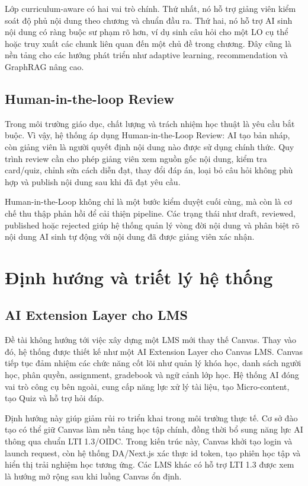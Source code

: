Lớp curriculum-aware có hai vai trò chính. Thứ nhất, nó hỗ trợ giảng viên kiểm
soát độ phủ nội dung theo chương và chuẩn đầu ra. Thứ hai, nó hỗ trợ AI sinh
nội dung có ràng buộc sư phạm rõ hơn, ví dụ sinh câu hỏi cho một LO cụ thể
hoặc truy xuất các chunk liên quan đến một chủ đề trong chương. Đây cũng là
nền tảng cho các hướng phát triển như adaptive learning, recommendation và
GraphRAG nâng cao.

\subsection{Human-in-the-loop Review}

Trong môi trường giáo dục, chất lượng và trách nhiệm học thuật là yêu cầu bắt
buộc. Vì vậy, hệ thống áp dụng Human-in-the-Loop Review: AI tạo bản nháp, còn
giảng viên là người quyết định nội dung nào được sử dụng chính thức. Quy trình
review cần cho phép giảng viên xem nguồn gốc nội dung, kiểm tra card/quiz,
chỉnh sửa cách diễn đạt, thay đổi đáp án, loại bỏ câu hỏi không phù hợp và
publish nội dung sau khi đã đạt yêu cầu.

Human-in-the-Loop không chỉ là một bước kiểm duyệt cuối cùng, mà còn là cơ chế
thu thập phản hồi để cải thiện pipeline. Các trạng thái như draft, reviewed,
published hoặc rejected giúp hệ thống quản lý vòng đời nội dung và phân biệt
rõ nội dung AI sinh tự động với nội dung đã được giảng viên xác nhận.

\section{Định hướng và triết lý hệ thống}

\subsection{AI Extension Layer cho LMS}

Đề tài không hướng tới việc xây dựng một LMS mới thay thế Canvas. Thay vào đó,
hệ thống được thiết kế như một AI Extension Layer cho Canvas LMS. Canvas tiếp
tục đảm nhiệm các chức năng cốt lõi như quản lý khóa học, danh sách người học,
phân quyền, assignment, gradebook và ngữ cảnh lớp học. Hệ thống AI đóng vai
trò công cụ bên ngoài, cung cấp năng lực xử lý tài liệu, tạo Micro-content, tạo
Quiz và hỗ trợ hỏi đáp.

Định hướng này giúp giảm rủi ro triển khai trong môi trường thực tế. Cơ sở đào
tạo có thể giữ Canvas làm nền tảng học tập chính, đồng thời bổ sung năng lực
AI thông qua chuẩn LTI 1.3/OIDC. Trong kiến trúc này, Canvas khởi tạo login và
launch request, còn hệ thống DA/Next.js xác thực id token, tạo phiên học tập và
hiển thị trải nghiệm học tương ứng. Các LMS khác có hỗ trợ LTI 1.3 được xem là
hướng mở rộng sau khi luồng Canvas ổn định.

